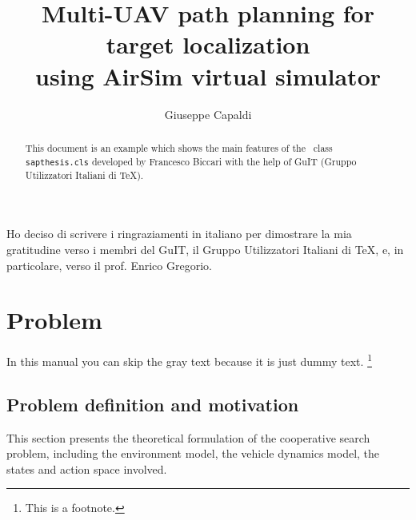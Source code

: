 \documentclass[LaM,binding=0.6cm]{sapthesis}
\title{Multi-UAV path planning for target localization\\ using AirSim virtual simulator}
\author{Giuseppe Capaldi}
\begin{document}
\frontmatter

\maketitle

\dedication{Dedicated to\\ my family}

\begin{abstract}
This document is an example which shows the main features of
the \LaTeXe\ class \texttt{sapthesis.cls} developed by Francesco Biccari
with the help of GuIT (Gruppo Utilizzatori Italiani di \TeX).
\end{abstract}

\begin{acknowledgments}
Ho deciso di scrivere i ringraziamenti in italiano
per dimostrare la mia gratitudine verso i membri
del GuIT, il Gruppo Utilizzatori Italiani di \TeX, e, in particolare,
verso il prof. Enrico Gregorio.
\end{acknowledgments}

\tableofcontents

\chapter{Problem}

In this manual you can skip the gray text because it is just dummy text.%
\footnote{This is a footnote.}

\textcolor{gray}{\lipsum[1-22]}


\section*{Problem definition and motivation}
This section presents the theoretical formulation of the cooperative search
problem, including the environment model, the vehicle dynamics
model, the states and action space involved.
\end{document}
